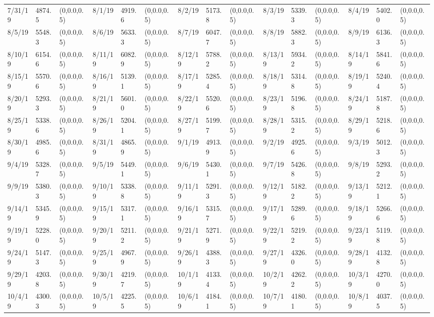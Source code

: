 \documentclass[12pt]{article}
\begin{document}
\begin{table}
\begin{center}
\begin{tabular}{p{15pt}p{15pt}p{25pt}p{15pt}p{15pt}p{25pt}p{15pt}p{15pt}p{25pt}p{15pt}p{15pt}p{25pt}p{15pt}p{15pt}p{25pt}}
            7/31/19&4874.5&(0,0.0,0.5)&8/1/19&4919.6&(0,0.0,0.5)&8/2/19&5173.8&(0,0.0,0.5)&8/3/19&5339.3&(0,0.0,0.5)&8/4/19&5402.0&(0,0.0,0.5)\\
            8/5/19&5548.3&(0,0.0,0.5)&8/6/19&5633.3&(0,0.0,0.5)&8/7/19&6047.7&(0,0.0,0.5)&8/8/19&5882.3&(0,0.0,0.5)&8/9/19&6136.3&(0,0.0,0.5)\\
            8/10/19&6154.6&(0,0.0,0.5)&8/11/19&6082.9&(0,0.0,0.5)&8/12/19&5788.2&(0,0.0,0.5)&8/13/19&5934.2&(0,0.0,0.5)&8/14/19&5841.6&(0,0.0,0.5)\\
            8/15/19&5570.6&(0,0.0,0.5)&8/16/19&5139.1&(0,0.0,0.5)&8/17/19&5285.4&(0,0.0,0.5)&8/18/19&5314.8&(0,0.0,0.5)&8/19/19&5240.4&(0,0.0,0.5)\\
            8/20/19&5293.3&(0,0.0,0.5)&8/21/19&5601.0&(0,0.0,0.5)&8/22/19&5520.6&(0,0.0,0.5)&8/23/19&5196.8&(0,0.0,0.5)&8/24/19&5187.8&(0,0.0,0.5)\\
            8/25/19&5338.6&(0,0.0,0.5)&8/26/19&5204.1&(0,0.0,0.5)&8/27/19&5199.7&(0,0.0,0.5)&8/28/19&5315.2&(0,0.0,0.5)&8/29/19&5218.6&(0,0.0,0.5)\\
            8/30/19&4985.6&(0,0.0,0.5)&8/31/19&4865.9&(0,0.0,0.5)&9/1/19&4913.9&(0,0.0,0.5)&9/2/19&4925.6&(0,0.0,0.5)&9/3/19&5012.3&(0,0.0,0.5)\\
            9/4/19&5328.7&(0,0.0,0.5)&9/5/19&5449.1&(0,0.0,0.5)&9/6/19&5430.1&(0,0.0,0.5)&9/7/19&5426.8&(0,0.0,0.5)&9/8/19&5293.2&(0,0.0,0.5)\\
            9/9/19&5380.3&(0,0.0,0.5)&9/10/19&5338.8&(0,0.0,0.5)&9/11/19&5291.3&(0,0.0,0.5)&9/12/19&5182.2&(0,0.0,0.5)&9/13/19&5212.1&(0,0.0,0.5)\\
            9/14/19&5345.9&(0,0.0,0.5)&9/15/19&5317.1&(0,0.0,0.5)&9/16/19&5315.7&(0,0.0,0.5)&9/17/19&5289.6&(0,0.0,0.5)&9/18/19&5266.6&(0,0.0,0.5)\\
            9/19/19&5228.0&(0,0.0,0.5)&9/20/19&5211.2&(0,0.0,0.5)&9/21/19&5271.9&(0,0.0,0.5)&9/22/19&5219.2&(0,0.0,0.5)&9/23/19&5119.8&(0,0.0,0.5)\\
            9/24/19&5147.3&(0,0.0,0.5)&9/25/19&4967.9&(0,0.0,0.5)&9/26/19&4388.3&(0,0.0,0.5)&9/27/19&4326.0&(0,0.0,0.5)&9/28/19&4132.8&(0,0.0,0.5)\\
            9/29/19&4203.8&(0,0.0,0.5)&9/30/19&4219.7&(0,0.0,0.5)&10/1/19&4133.4&(0,0.0,0.5)&10/2/19&4262.2&(0,0.0,0.5)&10/3/19&4270.0&(0,0.0,0.5)\\
            10/4/19&4300.3&(0,0.0,0.5)&10/5/19&4225.5&(0,0.0,0.5)&10/6/19&4184.1&(0,0.0,0.5)&10/7/19&4180.1&(0,0.0,0.5)&10/8/19&4037.5&(0,0.0,0.5)\\

\end{tabular}
\end{center}
\end{table}
\end{document}
